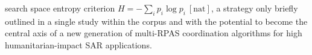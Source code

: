 search space entropy criterion $H = -\sum_i p_i \log p_i\ [\text{nat}]$, a strategy only briefly outlined in a single study within the corpus \cite{wang2025} and with the potential to become the central axis of a new generation of multi-RPAS coordination algorithms for high humanitarian-impact SAR applications.